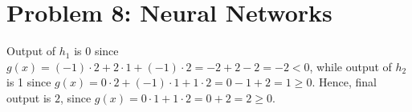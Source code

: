 \documentclass[11pt,fancychapters]{article}
\begin{document}
\section*{Problem 8: Neural Networks}

Output of $h_1$ is 0 since $g(x) = (-1) \cdot 2 + 2 \cdot 1 + (-1) \cdot 2 = -2 + 2 - 2 = -2 < 0$, while output of $h_2$ is 1 since $g(x) = 0 \cdot 2 + (-1) \cdot 1 + 1 \cdot 2 = 0 - 1 + 2 = 1 \geq 0$. Hence, final output is $2$, since $g(x) = 0 \cdot 1 + 1 \cdot 2 = 0 + 2 = 2 \geq 0$.
\end{document}
